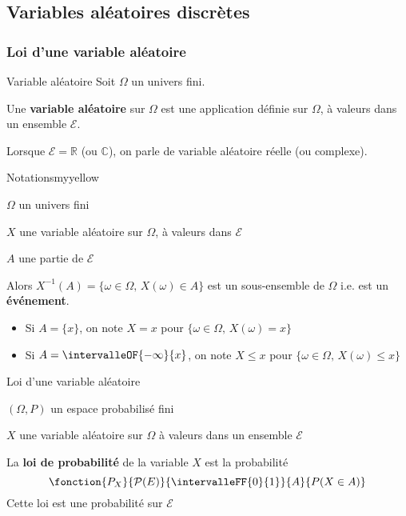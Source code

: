 
\subsection{Variables aléatoires discrètes}

    \subsubsection{Loi d’une variable aléatoire}

    \begin{defi}{Variable aléatoire}{}
        Soit $\Omega$ un univers fini.
    
        Une \textbf{variable aléatoire} sur $\Omega$ est une application définie sur $\Omega$, à valeurs dans un ensemble $\mathcal{E}$.

        Lorsque $\mathcal{E} = \mathbb{R}$ (ou $\mathbb{C}$), on parle de variable aléatoire réelle (ou complexe).
    \end{defi}

    \begin{omed}{Notations}{myyellow}
        \begin{soient}
            \item $\Omega$ un univers fini
            \item $X$ une variable aléatoire sur $\Omega$, à valeurs dans $\mathcal{E}$
            \item $A$ une partie de $\mathcal{E}$
        \end{soient}
        Alors $X^{-1}(A) = \{ \omega \in \Omega, \, X(\omega) \in A \}$ est un sous-ensemble de $\Omega$ i.e. est un \textbf{événement}.
        \begin{itemize}
            \item Si $A = \{ x \}$, on note $X = x$ pour $ \{ \omega \in \Omega, \, X(\omega) = x \}$
            \item Si $A = \intervalleOF{-\infty}{x}$, on note $X \leq x$ pour $\{ \omega \in \Omega, \, X(\omega) \leq x \}$
        \end{itemize}
    \end{omed}

    \begin{defi}{Loi d’une variable aléatoire}{}
        \begin{soient}
            \item $(\Omega,P)$ un espace probabilisé fini
            \item $X$ une variable aléatoire sur $\Omega$ à valeurs dans un ensemble $\mathcal{E}$
        \end{soient}
        La \textbf{loi de probabilité} de la variable $X$ est la probabilité 
        \[ \fonction{P_X}{\mathcal{P}(E)}{\intervalleFF{0}{1}}{A}{P(X \in A)} \]
        Cette loi est une probabilité sur $\mathcal{E}$
    \end{defi}

